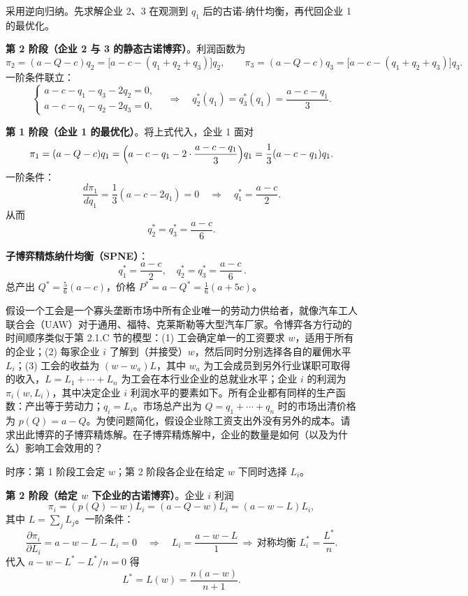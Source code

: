 \sol
采用逆向归纳。先求解企业 2、3 在观测到 $q_1$ 后的古诺-纳什均衡，再代回企业 1 的最优化。

\textbf{第 2 阶段（企业 2 与 3 的静态古诺博弈）}。利润函数为
\[
\pi_2=(a-Q-c)q_2=\bigl[a-c-(q_1+q_2+q_3)\bigr]q_2,\qquad
\pi_3=(a-Q-c)q_3=\bigl[a-c-(q_1+q_2+q_3)\bigr]q_3.
\]\indent
一阶条件联立：
\[
\begin{cases}
a-c-q_1-q_3-2q_2=0,\\
a-c-q_1-q_2-2q_3=0,
\end{cases}
\quad\Longrightarrow\quad
q_2^*(q_1)=q_3^*(q_1)=\dfrac{a-c-q_1}{3}.
\]

\textbf{第 1 阶段（企业 1 的最优化）}。将上式代入，企业 1 面对
\[
\pi_1=(a-Q-c)q_1
=\Bigl(a-c-q_1-2\cdot\frac{a-c-q_1}{3}\Bigr)q_1
=\frac{1}{3}(a-c-q_1)q_1.
\]\indent
一阶条件：
\[
\frac{d\pi_1}{dq_1}=\frac{1}{3}(a-c-2q_1)=0
\quad\Longrightarrow\quad
q_1^*=\frac{a-c}{2}.
\]\indent
从而
\[
q_2^*=q_3^*=\frac{a-c}{6}.
\]

\textbf{子博弈精炼纳什均衡（SPNE）}：
\[
\boxed{\,q_1^*=\dfrac{a-c}{2},\quad q_2^*=q_3^*=\dfrac{a-c}{6}\,}.
\]\indent
总产出 $Q^*=\frac{5}{6}(a-c)$，价格 $P^*=a-Q^*=\frac{1}{6}(a+5c)$。

假设一个工会是一个寡头垄断市场中所有企业唯一的劳动力供给者，就像汽车工人联合会（UAW）对于通用、福特、克莱斯勒等大型汽车厂家。令博弈各方行动的时间顺序类似于第 2.1.C 节的模型：(1) 工会确定单一的工资要求 $w$，适用于所有的企业；(2) 每家企业 $i$ 了解到（并接受）$w$，然后同时分别选择各自的雇佣水平 $L_i$；(3) 工会的收益为 $(w-w_a)L$，其中 $w_a$ 为工会成员到另外行业谋职可取得的收入，$L=L_1+\cdots+L_n$ 为工会在本行业企业的总就业水平；企业 $i$ 的利润为 $\pi_i(w,L_i)$，其中决定企业 $i$ 利润水平的要素如下。所有企业都有同样的生产函数：产出等于劳动力；$q_i=L_i$。市场总产出为 $Q=q_1+\cdots+q_n$ 时的市场出清价格为 $p(Q)=a-Q$。为使问题简化，假设企业除工资支出外没有另外的成本。请求出此博弈的子博弈精炼解。在子博弈精炼解中，企业的数量是如何（以及为什么）影响工会效用的？

\sol
时序：第 1 阶段工会定 $w$；第 2 阶段各企业在给定 $w$ 下同时选择 $L_i$。

\textbf{第 2 阶段（给定 $w$ 下企业的古诺博弈）}。企业 $i$ 利润
\[
\pi_i=(p(Q)-w)L_i=(a-Q-w)L_i=(a-w-L)L_i,
\]\indent
其中 $L=\sum_j L_j$。一阶条件：
\[
\frac{\partial\pi_i}{\partial L_i}=a-w-L-L_i=0
\quad\Longrightarrow\quad
L_i=\frac{a-w-L}{1}\,\Rightarrow\,\text{对称均衡 }L_i^*=\frac{L^*}{n}.
\]\indent
代入 $a-w-L^*-L^*/n=0$ 得
\[
L^*=L(w)=\frac{n(a-w)}{n+1}.
\]

